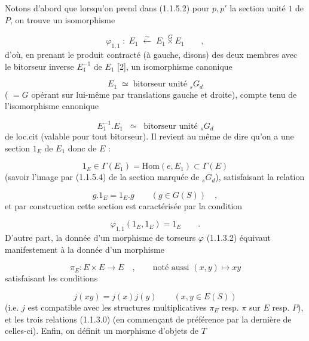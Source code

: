 Notons d'abord que lorsqu'on prend dans (1.1.5.2) pour $p,p'$ la section unité $1$ de $P$, on trouve un isomorphisme

\begin{equation}\tag{1.1.5.3}
\varphi_{1,1} \; : \; E_{1} \;\overset{\sim}{\longleftarrow}\; E_{1} \overset{G}{\times} E_{1} \qquad ,
\end{equation}
d'où, en prenant le produit contracté (à gauche, disons) des deux membres avec le bitorseur inverse $E_{1}^{-1}$ de $E_{1}$ [2], un isomorphisme canonique

\begin{equation}\tag{1.1.5.4}
E_{1} \;\simeq\; \text{bitorseur unité } {}_{s}G_{d}
\end{equation}
( $= G$ opérant sur lui-même par translations gauche et droite), compte tenu
de l'isomorphisme canonique

\begin{equation*}
E_1^{-1}.E_1 \;\; \simeq \;\; \text{bitorseur unité } {}_sG_d
\end{equation*}
de loc.cit (valable pour tout bitorseur). Il revient au même de dire qu'on a une section $1_E$ de $E_1$ donc de $E$ :

\begin{equation}\tag{1.1.5.5}
1_E \in \Gamma(E_1) = \mathrm{Hom}(e,E_1) \subset \Gamma(E)
\end{equation}
(savoir l'image par (1.1.5.4) de la section marquée de ${}_sG_d$), satisfaisant la relation

\begin{equation*}
g.1_E = 1_E.g \qquad (g \in G(S)) \quad ,
\end{equation*}
et par construction cette section est caractérisée par la condition

\begin{equation}\tag{1.1.5.6}
\varphi_{1,1}(1_E,1_E) = 1_E \qquad .
\end{equation}
D'autre part, la donnée d'un morphisme de torseurs $\varphi$ (1.1.3.2) équivaut manifestement à la donnée d'un morphisme

\begin{equation}\tag{1.1.5.7}
\pi_E : E\times E \longrightarrow E \quad , \qquad \text{noté aussi } (x,y) \longmapsto xy
\end{equation}
satisfaisant les conditions

\begin{equation}\tag{1.1.5.8}
j(xy) = j(x)j(y) \qquad (x,y \in E(S))
\end{equation}
(i.e. $j$ est compatible avec les structures multiplicatives $\pi_E$ resp. $\pi$ sur $E$ resp. $P$), et les trois relations (1.1.3.0) (en commençant de préférence par la dernière de celles-ci). Enfin, on définit un morphisme d'objets de \underline{$T$}

